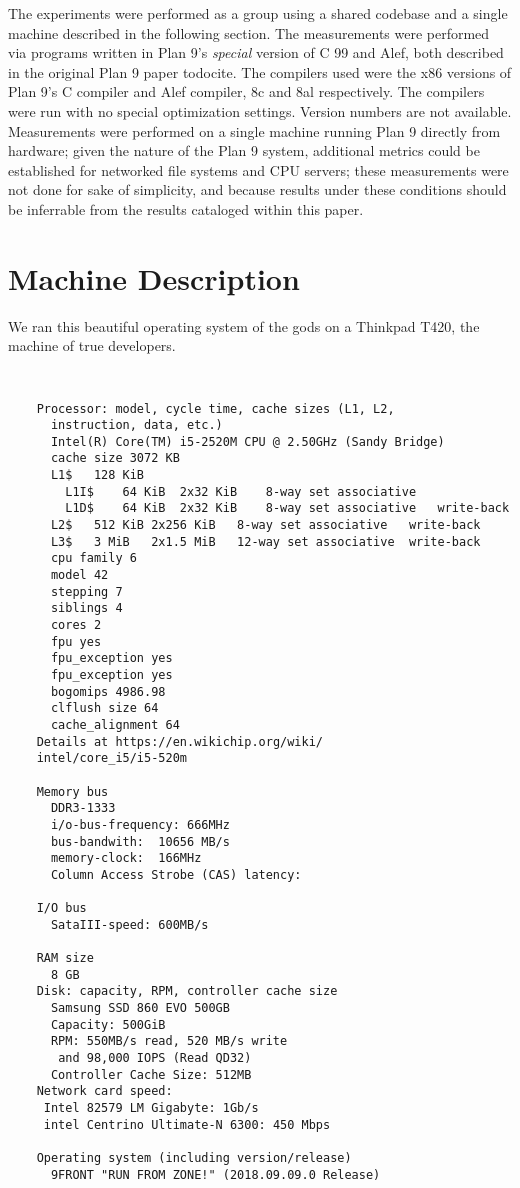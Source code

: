 \documentclass[letterpaper,twocolumn,10pt]{article}
\begin{document}
The experiments were performed as a group using a shared codebase and a single machine described in the following section. The measurements were performed via programs written in Plan 9's \textit{special} version of C 99 and Alef, both described in the original Plan 9 paper todo{cite}. The compilers used were the x86 versions of Plan 9's C compiler and Alef compiler, 8c and 8al respectively. The compilers were run with no special optimization settings. Version numbers are not available. Measurements were performed on a single machine running Plan 9 directly from hardware; given the nature of the Plan 9 system, additional metrics could be established for networked file systems and CPU servers; these measurements were not done for sake of simplicity, and because results under these conditions should be inferrable from the results cataloged within this paper.

\section{Machine Description}

We ran this beautiful operating system of the gods on a Thinkpad T420, the machine of true developers.

{\tt \small
\begin{verbatim}
    Processor: model, cycle time, cache sizes (L1, L2,
      instruction, data, etc.)
      Intel(R) Core(TM) i5-2520M CPU @ 2.50GHz (Sandy Bridge)
      cache size 3072 KB
      L1$	128 KiB	
        L1I$	64 KiB	2x32 KiB	8-way set associative	 
        L1D$	64 KiB	2x32 KiB	8-way set associative	write-back
      L2$	512 KiB 2x256 KiB	8-way set associative	write-back
      L3$	3 MiB   2x1.5 MiB	12-way set associative	write-back
      cpu family 6
      model 42
      stepping 7
      siblings 4
      cores 2
      fpu yes
      fpu_exception yes
      fpu_exception yes
      bogomips 4986.98
      clflush size 64
      cache_alignment 64
    Details at https://en.wikichip.org/wiki/
    intel/core_i5/i5-520m 

    Memory bus
      DDR3-1333
      i/o-bus-frequency: 666MHz
      bus-bandwith:  10656 MB/s
      memory-clock:  166MHz
      Column Access Strobe (CAS) latency:

    I/O bus
      SataIII-speed: 600MB/s

    RAM size
      8 GB
    Disk: capacity, RPM, controller cache size
      Samsung SSD 860 EVO 500GB
      Capacity: 500GiB
      RPM: 550MB/s read, 520 MB/s write
       and 98,000 IOPS (Read QD32)
      Controller Cache Size: 512MB 
    Network card speed:
     Intel 82579 LM Gigabyte: 1Gb/s
     intel Centrino Ultimate-N 6300: 450 Mbps
      
    Operating system (including version/release) 
      9FRONT "RUN FROM ZONE!" (2018.09.09.0 Release)
\end{verbatim}
}
\end{document}
